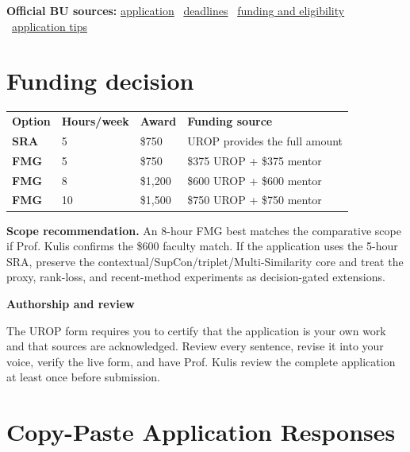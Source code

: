 \documentclass[11pt,letterpaper]{article}
\begin{document}
\textbf{Official BU sources:}
\href{https://www.bu.edu/urop/get-involved/application-2/}{application}
\textperiodcentered\
\href{https://www.bu.edu/urop/get-involved/deadlines/}{deadlines}
\textperiodcentered\
\href{https://www.bu.edu/urop/get-involved/funding-eligibility/}{funding and eligibility}
\textperiodcentered\
\href{https://www.bu.edu/urop/get-involved/application-tips/}{application tips}

\section*{Funding decision}

\begin{center}
\begin{tabularx}{\textwidth}{>{\bfseries}p{} C{0.17\textwidth} C{0.17\textwidth} Y}
  \color{white}Option &
  \color{white}\bfseries Hours/week &
  \color{white}\bfseries Award &
  \color{white}\bfseries Funding source \\
  SRA & 5 & \$750 & UROP provides the full amount \\
  FMG & 5 & \$750 & \$375 UROP + \$375 mentor \\
  FMG & 8 & \$1,200 & \$600 UROP + \$600 mentor \\
  FMG & 10 & \$1,500 & \$750 UROP + \$750 mentor \\
\end{tabularx}
\end{center}

\textbf{Scope recommendation.}
An 8-hour FMG best matches the comparative scope if Prof. Kulis confirms the \$600 faculty match. If the application uses the 5-hour SRA, preserve the contextual/SupCon/triplet/Multi-Similarity core and treat the proxy, rank-loss, and recent-method experiments as decision-gated extensions.

\begin{infobox}
\textbf{\color{DarkAccent}Authorship and review}

The UROP form requires you to certify that the application is your own work and that sources are acknowledged. Review every sentence, revise it into your voice, verify the live form, and have Prof. Kulis review the complete application at least once before submission.
\end{infobox}

\section*{Copy-Paste Application Responses}
\end{document}
